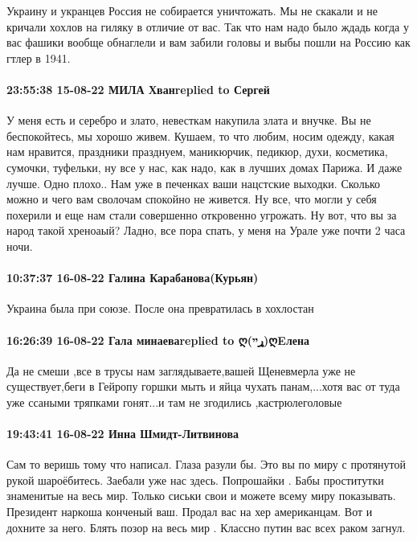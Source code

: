 Украину и укранцев Россия не собирается уничтожать. Мы не скакали и не кричали
хохлов на гиляку в отличие от вас. Так что нам надо было ждадь когда у вас
фашики вообще обнаглели и вам забили головы и выбы пошли на Россию как гтлер в
1941.

\paragraph{23:55:38 15-08-22 МИЛА Хванreplied to Сергей}

У меня есть и серебро и злато, невесткам накупила злата и внучке. Вы не
беспокойтесь, мы хорошо живем. Кушаем, то что любим, носим одежду, какая нам
нравится, праздники празднуем, маникюрчик, педикюр, духи, косметика, сумочки,
туфельки, ну все у нас, как надо, как в лучших домах Парижа. И даже лучше. Одно
плохо.. Нам уже в печенках ваши нацстские выходки. Сколько можно и чего вам
сволочам спокойно не живется. Ну все, что могли у себя похерили и еще нам стали
совершенно откровенно угрожать. Ну вот, что вы за народ такой хреноаый? Ладно,
все пора спать, у меня на Урале уже почти 2 часа ночи.

\paragraph{10:37:37 16-08-22 Галина Карабанова(Курьян)}

Украина была при союзе. После она превратилась в хохлостан

\paragraph{16:26:39 16-08-22 Гала минаеваreplied to ღ(ړײ)ღEлена}

Да не смеши ,все в трусы нам заглядываете,вашей Щеневмерла уже не
существует,беги в Гейропу горшки мыть и яйца чухать панам,...хотя вас от туда
уже ссаными тряпками гонят...и там не згодились ,кастрюлеголовые

\paragraph{19:43:41 16-08-22 Инна Шмидт-Литвинова}

Сам то веришь тому что написал. Глаза разули бы. Это вы по миру с протянутой
рукой шароёбитесь. Заебали уже нас здесь. Попрошайки . Бабы проститутки
знаменитые на весь мир. Только сиськи свои и можете всему миру показывать.
Президент наркоша конченый ваш. Продал вас на хер американцам. Вот и дохните за
него. Блять позор на весь мир . Классно путин вас всех раком загнул.

